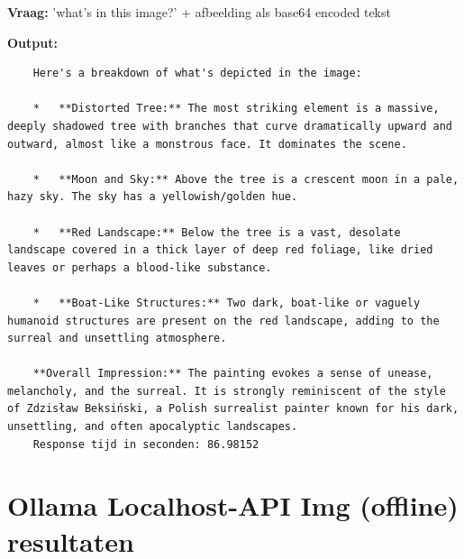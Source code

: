 \textbf{Vraag:} 'what's in this image?' + afbeelding als base64 encoded tekst

\textbf{Output:}

\begin{verbatim}
    Here's a breakdown of what's depicted in the image:
    
    *   **Distorted Tree:** The most striking element is a massive, deeply shadowed tree with branches that curve dramatically upward and outward, almost like a monstrous face. It dominates the scene.
    
    *   **Moon and Sky:** Above the tree is a crescent moon in a pale, hazy sky. The sky has a yellowish/golden hue.
    
    *   **Red Landscape:** Below the tree is a vast, desolate landscape covered in a thick layer of deep red foliage, like dried leaves or perhaps a blood-like substance.
    
    *   **Boat-Like Structures:** Two dark, boat-like or vaguely humanoid structures are present on the red landscape, adding to the surreal and unsettling atmosphere.
    
    **Overall Impression:** The painting evokes a sense of unease, melancholy, and the surreal. It is strongly reminiscent of the style of Zdzisław Beksiński, a Polish surrealist painter known for his dark, unsettling, and often apocalyptic landscapes.
    Response tijd in seconden: 86.98152
\end{verbatim}

\section{Ollama Localhost-API Img (offline) resultaten}
\label{sec:ollamalocalhostapiimgofflineresultaten}

